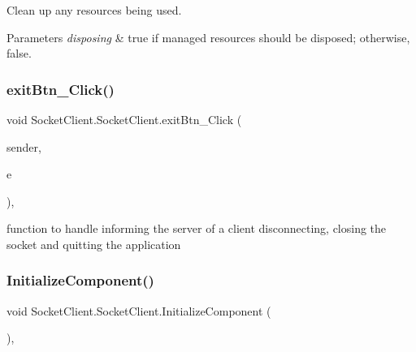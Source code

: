 Clean up any resources being used. 


\begin{DoxyParams}{Parameters}
{\em disposing} & true if managed resources should be disposed; otherwise, false.\\
\hline
\end{DoxyParams}
\mbox{\label{class_socket_client_1_1_socket_client_ad67a72749598ea2ceeb026e4cb5469c7}} 
\subsubsection{\texorpdfstring{exit\+Btn\+\_\+\+Click()}{exitBtn\_Click()}}
{\footnotesize\ttfamily void Socket\+Client.\+Socket\+Client.\+exit\+Btn\+\_\+\+Click (\begin{DoxyParamCaption}\item[{object}]{sender,  }\item[{Event\+Args}]{e }\end{DoxyParamCaption})\hspace{0.3cm}{\ttfamily [inline]}, {\ttfamily [private]}}

function to handle informing the server of a client disconnecting, closing the socket and quitting the application \mbox{\label{class_socket_client_1_1_socket_client_ae31dc82e1b1d076129b128b42886be56}} 
\subsubsection{\texorpdfstring{Initialize\+Component()}{InitializeComponent()}}
{\footnotesize\ttfamily void Socket\+Client.\+Socket\+Client.\+Initialize\+Component (\begin{DoxyParamCaption}{ }\end{DoxyParamCaption})\hspace{0.3cm}{\ttfamily [inline]}, {\ttfamily [private]}}




